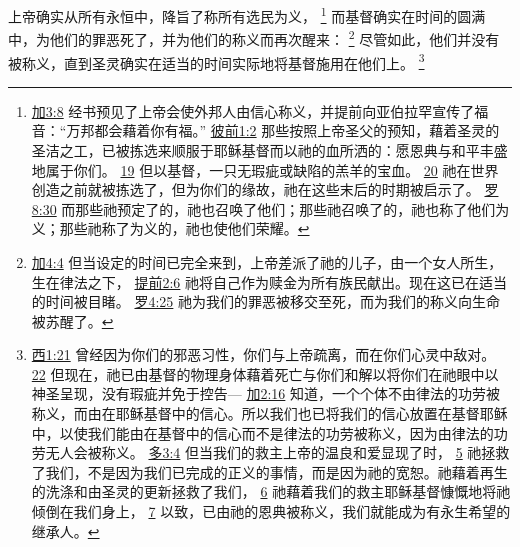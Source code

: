 \documentclass[12pt, a4paper, oneside]{ctexart}
\newcounter{parnum}[section]
\newcommand{\N}{%
   \noindent\refstepcounter{parnum}%
    \makebox[\parindent][l]{\textbf{\arabic{parnum}.}}}
\begin{document}
\N 上帝确实从所有永恒中，降旨了称所有选民为义，
	\footnote {
		\href{https://biblehub.com/galatians/3-8.htm}{加3:8} 经书预见了上帝会使外邦人由信心称义，并提前向亚伯拉罕宣传了福音：“万邦都会藉着你有福。”
		\href{https://biblehub.com/1_peter/1-2.htm}{彼前1:2} 那些按照上帝圣父的预知，藉着圣灵的圣洁之工，已被拣选来顺服于耶稣基督而以祂的血所洒的：愿恩典与和平丰盛地属于你们。
		\href{https://biblehub.com/1_peter/1-19.htm}{19} 但以基督，一只无瑕疵或缺陷的羔羊的宝血。
		\href{https://biblehub.com/1_peter/1-20.htm}{20} 祂在世界创造之前就被拣选了，但为你们的缘故，祂在这些末后的时期被启示了。
		\href{https://biblehub.com/romans/8-30.htm}{罗8:30} 而那些祂预定了的，祂也召唤了他们；那些祂召唤了的，祂也称了他们为义；那些祂称了为义的，祂也使他们荣耀。
	}
	而基督确实在时间的圆满中，为他们的罪恶死了，并为他们的称义而再次醒来：
	\footnote {
		\href{https://biblehub.com/galatians/4-4.htm}{加4:4} 但当设定的时间已完全来到，上帝差派了祂的儿子，由一个女人所生，生在律法之下，
		\href{https://biblehub.com/1_timothy/2-6.htm}{提前2:6} 祂将自己作为赎金为所有族民献出。现在这已在适当的时间被目睹。
		\href{https://biblehub.com/romans/4-25.htm}{罗4:25} 祂为我们的罪恶被移交至死，而为我们的称义向生命被苏醒了。
	}
	尽管如此，他们并没有被称义，直到圣灵确实在适当的时间实际地将基督施用在他们上。
	\footnote {
		\href{https://biblehub.com/colossians/1-21.htm}{西1:21} 曾经因为你们的邪恶习性，你们与上帝疏离，而在你们心灵中敌对。
		\href{https://biblehub.com/colossians/1-22.htm}{22} 但现在，祂已由基督的物理身体藉着死亡与你们和解以将你们在祂眼中以神圣呈现，没有瑕疵并免于控告---
		\href{https://biblehub.com/galatians/2-16.htm}{加2:16} 知道，一个个体不由律法的功劳被称义，而由在耶稣基督中的信心。所以我们也已将我们的信心放置在基督耶稣中，以使我们能由在基督中的信心而不是律法的功劳被称义，因为由律法的功劳无人会被称义。
		\href{https://biblehub.com/titus/3-4.htm}{多3:4} 但当我们的救主上帝的温良和爱显现了时，
		\href{https://biblehub.com/titus/3-5.htm}{5} 祂拯救了我们，不是因为我们已完成的正义的事情，而是因为祂的宽恕。祂藉着再生的洗涤和由圣灵的更新拯救了我们，
		\href{https://biblehub.com/titus/3-6.htm}{6} 祂藉着我们的救主耶稣基督慷慨地将祂倾倒在我们身上，
		\href{https://biblehub.com/titus/3-7.htm}{7} 以致，已由祂的恩典被称义，我们就能成为有永生希望的继承人。
	}
\end{document}
